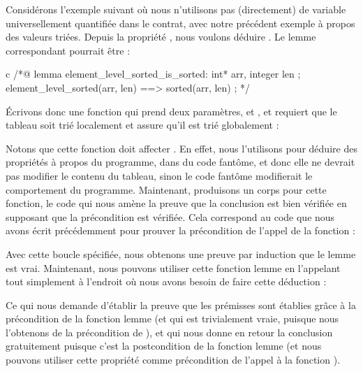 Considérons l'exemple suivant où nous n'utilisons pas (directement) de
variable universellement quantifiée dans le contrat, avec notre précédent
exemple à propos des valeurs triées. Depuis la propriété
, nous voulons déduire
. Le lemme correspondant pourrait être :


\begin{CodeBlock}{c}
/*@
  lemma element_level_sorted_is_sorted:
    \forall int* arr, integer len ;
       element_level_sorted(arr, len) ==> sorted(arr, len) ;
*/
\end{CodeBlock}


Écrivons donc une fonction qui prend deux paramètres,  et
, et requiert que le tableau soit trié localement et assure
qu'il est trié globalement :




Notons que cette fonction doit affecter .
En effet, nous l'utilisons pour déduire des propriétés à propos du programme, dans
du code fantôme, et donc elle ne devrait pas modifier le contenu du tableau, sinon
le code fantôme modifierait le comportement du programme. Maintenant, produisons un
corps pour cette fonction, le code qui nous amène la preuve que la conclusion est
bien vérifiée en supposant que la précondition est vérifiée. Cela correspond au
code que nous avons écrit précédemment pour prouver la précondition de l'appel de
la fonction  :





Avec cette boucle spécifiée, nous obtenons une preuve par induction que le lemme
est vrai. Maintenant, nous pouvons utiliser cette fonction lemme en
l'appelant tout simplement à l'endroit où nous avons besoin de faire cette
déduction :




Ce qui nous demande d'établir la preuve que les prémisses sont établies grâce
à la précondition de la fonction lemme (et qui est trivialement vraie,
puisque nous l'obtenons de la précondition de ), et
qui nous donne en retour la conclusion gratuitement puisque c'est la postcondition
de la fonction lemme (et nous pouvons utiliser cette propriété comme
précondition de l'appel à la fonction ).


